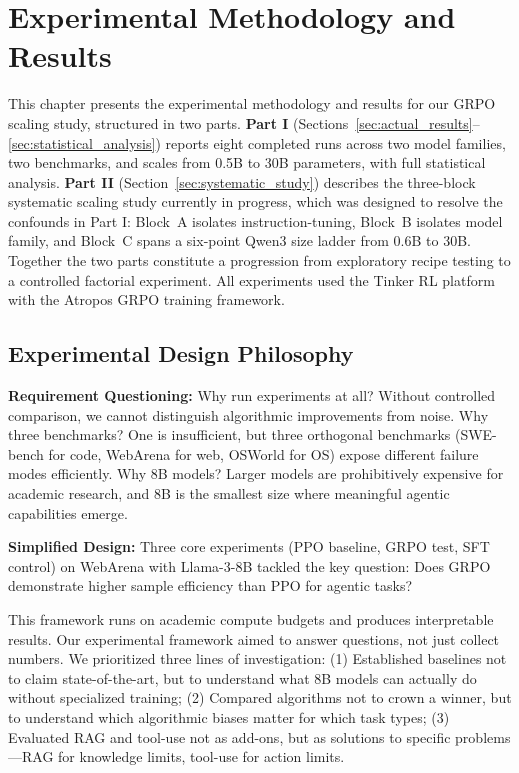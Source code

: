 \documentclass[12pt,a4paper]{report}
\theoremstyle{definition}
\begin{document}
\chapter{Experimental Methodology and Results}
\label{ch:experiments}

This chapter presents the experimental methodology and results for our GRPO scaling study, structured in two parts.  \textbf{Part I} (Sections~\ref{sec:actual_results}--\ref{sec:statistical_analysis}) reports eight completed runs across two model families, two benchmarks, and scales from 0.5B to 30B parameters, with full statistical analysis.  \textbf{Part II} (Section~\ref{sec:systematic_study}) describes the three-block systematic scaling study currently in progress, which was designed to resolve the confounds in Part I: Block~A isolates instruction-tuning, Block~B isolates model family, and Block~C spans a six-point Qwen3 size ladder from 0.6B to 30B.  Together the two parts constitute a progression from exploratory recipe testing to a controlled factorial experiment.  All experiments used the Tinker RL platform with the Atropos GRPO training framework.

\vspace{0.3cm}

\section{Experimental Design Philosophy}
\label{sec:design_philosophy}

\textbf{Requirement Questioning:} Why run experiments at all? Without controlled comparison, we cannot distinguish algorithmic improvements from noise. Why three benchmarks? One is insufficient, but three orthogonal benchmarks (SWE-bench for code, WebArena for web, OSWorld for OS) expose different failure modes efficiently. Why 8B models? Larger models are prohibitively expensive for academic research, and 8B is the smallest size where meaningful agentic capabilities emerge.

\textbf{Simplified Design:} Three core experiments (PPO baseline, GRPO test, SFT control) on WebArena with Llama-3-8B tackled the key question: Does GRPO demonstrate higher sample efficiency than PPO for agentic tasks?

This framework runs on academic compute budgets and produces interpretable results.
Our experimental framework aimed to answer questions, not just collect numbers. We prioritized three lines of investigation: (1) Established baselines not to claim state-of-the-art, but to understand what 8B models can actually do without specialized training; (2) Compared algorithms not to crown a winner, but to understand which algorithmic biases matter for which task types; (3) Evaluated RAG and tool-use not as add-ons, but as solutions to specific problems---RAG for knowledge limits, tool-use for action limits.
\end{document}
